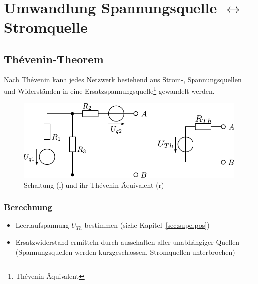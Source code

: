 



\newpage
\section{Umwandlung Spannungsquelle $\leftrightarrow$ Stromquelle}

\subsection{Thévenin-Theorem}
Nach Thévenin kann jedes Netzwerk bestehend aus Strom-, Spannungsquellen und Widerständen in eine Ersatzspannungsquelle\footnote{Thévenin-Äquivalent} gewandelt werden.

\begin{figure}[h!]
\centering
\includegraphics[scale=\schscale]{../fig/thevenin_sch_2.pdf}
\caption{Schaltung (l) und ihr Thévenin-Äquivalent (r)}
\label{sch:thevenin}
\end{figure}

\subsubsection{Berechnung}
\begin{itemize}
\item Leerlaufspannung $U_{Th}$ bestimmen (siehe Kapitel~\ref{sec:superpos})
\item Ersatzwiderstand ermitteln durch ausschalten aller unabhängiger Quellen (Spannungsquellen werden kurzgeschlossen, Stromquellen unterbrochen)
\end{itemize}

